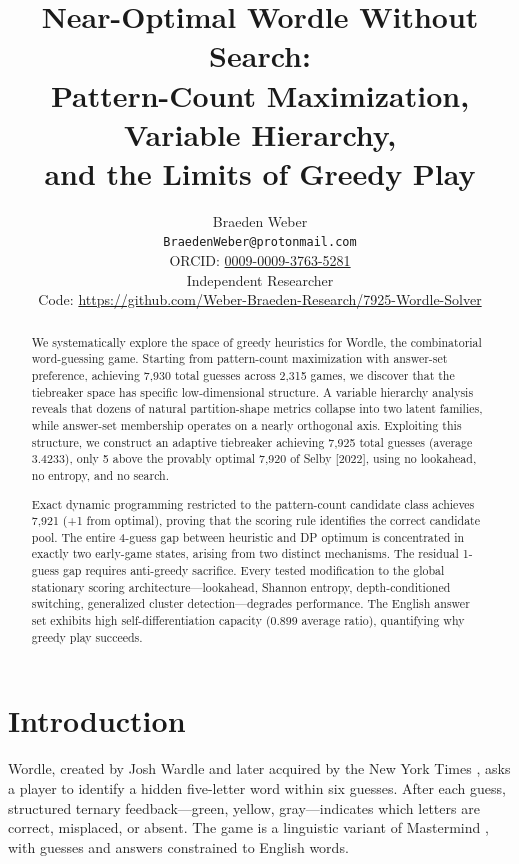 \documentclass[11pt]{article}
\title{Near-Optimal Wordle Without Search:\\
	Pattern-Count Maximization, Variable Hierarchy,\\
	and the Limits of Greedy Play}
\author{Braeden Weber\\
\texttt{BraedenWeber@protonmail.com}\\
ORCID: \href{https://orcid.org/0009-0009-3763-5281}{0009-0009-3763-5281}\\
Independent Researcher\\
Code: \url{https://github.com/Weber-Braeden-Research/7925-Wordle-Solver}}
\begin{document}
	\maketitle
	
	\begin{abstract}
		We systematically explore the space of greedy heuristics for Wordle, the combinatorial word-guessing game.  Starting from pattern-count maximization with answer-set preference, achieving 7,930 total guesses across 2,315 games, we discover that the tiebreaker space has specific low-dimensional structure.  A variable hierarchy analysis reveals that dozens of natural partition-shape metrics collapse into two latent families, while answer-set membership operates on a nearly orthogonal axis.  Exploiting this structure, we construct an adaptive tiebreaker achieving 7,925 total guesses (average 3.4233), only 5 above the provably optimal 7,920 of Selby [2022], using no lookahead, no entropy, and no search.
		
		Exact dynamic programming restricted to the pattern-count candidate class achieves 7,921 (+1 from optimal), proving that the scoring rule identifies the correct candidate pool.  The entire 4-guess gap between heuristic and DP optimum is concentrated in exactly two early-game states, arising from two distinct mechanisms.  The residual 1-guess gap requires anti-greedy sacrifice.  Every tested modification to the global stationary scoring architecture---lookahead, Shannon entropy, depth-conditioned switching, generalized cluster detection---degrades performance.  The English answer set exhibits high self-differentiation capacity (0.899 average ratio), quantifying why greedy play succeeds.
	\end{abstract}
	
	\section{Introduction}
	
	Wordle, created by Josh Wardle and later acquired by the New York Times \cite{wardle2021}, asks a player to identify a hidden five-letter word within six guesses.  After each guess, structured ternary feedback---green, yellow, gray---indicates which letters are correct, misplaced, or absent.  The game is a linguistic variant of Mastermind \cite{knuth1977}, with guesses and answers constrained to English words.
	
\end{document}

